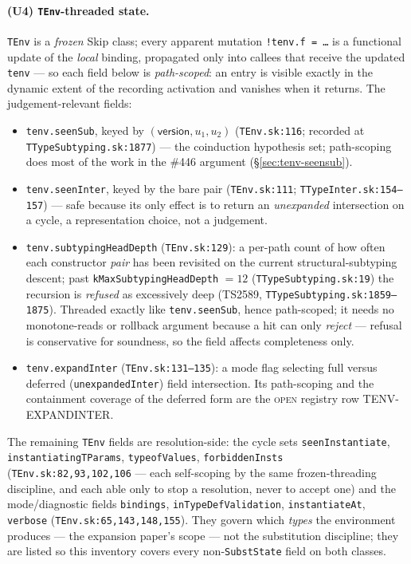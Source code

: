 \documentclass[11pt]{article}
\begin{document}
\paragraph{(U4) \texttt{TEnv}-threaded state.}
\texttt{TEnv} is a \emph{frozen} Skip class; every apparent mutation
\texttt{!tenv.f = \ldots} is a functional update of the \emph{local}
binding, propagated only into callees that receive the updated
\texttt{tenv} — so each field below is \emph{path-scoped}: an entry is
visible exactly in the dynamic extent of the recording activation and
vanishes when it returns. The judgement-relevant fields:
\begin{itemize}
\item \texttt{tenv.seenSub}, keyed by $(\mathsf{version}, u_1, u_2)$
  (\texttt{TEnv.sk:116}; recorded at
  \texttt{TTypeSubtyping.sk:1877}) — the coinduction hypothesis set;
  path-scoping does most of the work in the \#446 argument
  (\S\ref{sec:tenv-seensub}).
\item \texttt{tenv.seenInter}, keyed by the bare pair
  (\texttt{TEnv.sk:111}; \texttt{TTypeInter.sk:154--157}) — safe because
  its only effect is to return an \emph{unexpanded} intersection on a
  cycle, a representation choice, not a judgement.
\item \texttt{tenv.subtypingHeadDepth}
  (\texttt{TEnv.sk:129}): a per-path count of how often each
  constructor \emph{pair} has been revisited on the current
  structural-subtyping descent; past
  \texttt{kMaxSubtypingHeadDepth} $= 12$
  (\texttt{TTypeSubtyping.sk:19}) the recursion is \emph{refused} as
  excessively deep (TS2589, \texttt{TTypeSubtyping.sk:1859--1875}).
  Threaded exactly like \texttt{tenv.seenSub}, hence path-scoped; it
  needs no monotone-reads or rollback argument because a hit can only
  \emph{reject} — refusal is conservative for soundness, so the field
  affects completeness only.
\item \texttt{tenv.expandInter} (\texttt{TEnv.sk:131--135}): a mode flag
  selecting full versus deferred (\texttt{unexpandedInter}) field
  intersection. Its path-scoping and the containment coverage of the
  deferred form are the \textsc{open} registry row TENV-EXPANDINTER.
\end{itemize}
The remaining \texttt{TEnv} fields are resolution-side: the cycle sets
\texttt{seenInstantiate}, \texttt{instantiatingTParams},
\texttt{typeofValues}, \texttt{forbiddenInsts}
(\texttt{TEnv.sk:82,93,102,106} — each self-scoping by the same
frozen-threading discipline, and each able only to stop a resolution,
never to accept one) and the mode/diagnostic fields
\texttt{bindings}, \texttt{inTypeDefValidation},
\texttt{instantiateAt}, \texttt{verbose}
(\texttt{TEnv.sk:65,143,148,155}). They govern which \emph{types} the
environment produces — the expansion paper's scope — not the
substitution discipline; they are listed so this inventory covers every
non-\texttt{SubstState} field on both classes.
\end{document}

